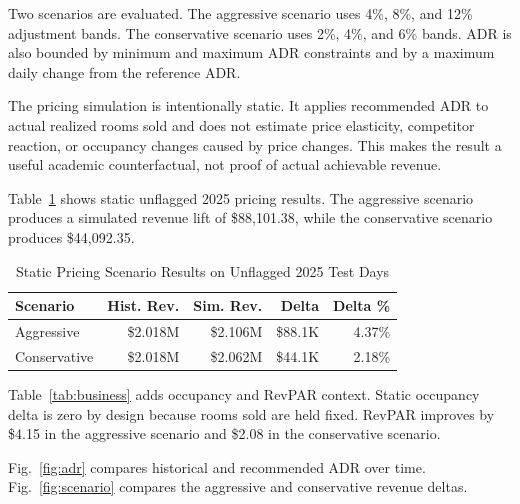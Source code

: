 \documentclass[conference]{IEEEtran}
\begin{document}
Two scenarios are evaluated. The aggressive scenario uses 4\%, 8\%, and 12\% adjustment bands. The conservative scenario uses 2\%, 4\%, and 6\% bands. ADR is also bounded by minimum and maximum ADR constraints and by a maximum daily change from the reference ADR.

The pricing simulation is intentionally static. It applies recommended ADR to actual realized rooms sold and does not estimate price elasticity, competitor reaction, or occupancy changes caused by price changes. This makes the result a useful academic counterfactual, not proof of actual achievable revenue.

Table~\ref{tab:pricing} shows static unflagged 2025 pricing results. The aggressive scenario produces a simulated revenue lift of \$88,101.38, while the conservative scenario produces \$44,092.35.

\begin{table}[t]
\centering
\caption{Static Pricing Scenario Results on Unflagged 2025 Test Days}
\label{tab:pricing}
\begin{tabular}{lrrrr}
\toprule
Scenario & Hist. Rev. & Sim. Rev. & Delta & Delta \%\\
\midrule
Aggressive & \$2.018M & \$2.106M & \$88.1K & 4.37\%\\
Conservative & \$2.018M & \$2.062M & \$44.1K & 2.18\%\\
\bottomrule
\end{tabular}
\end{table}

Table~\ref{tab:business} adds occupancy and RevPAR context. Static occupancy delta is zero by design because rooms sold are held fixed. RevPAR improves by \$4.15 in the aggressive scenario and \$2.08 in the conservative scenario.

\begin{table}[t]
\centering
\caption{Business Metrics on Unflagged 2025 Test Days}
\label{tab:business}
\end{table}

Fig.~\ref{fig:adr} compares historical and recommended ADR over time. Fig.~\ref{fig:scenario} compares the aggressive and conservative revenue deltas.
\end{document}
